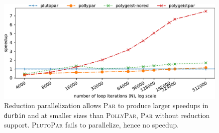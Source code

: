 \begin{figure}
  \centering
  \includegraphics[width=\linewidth]{images/durbin.pdf}
  \caption{Reduction parallelization allows \textsc{{\tool}Par} to produce larger speedups in \texttt{durbin} and at smaller sizes than \textsc{PollyPar}, \textsc{{\tool}Par} without reduction support. \textsc{PlutoPar} fails to parallelize, hence no speedup.}
  \label{fig:durbin_case}
\end{figure}


